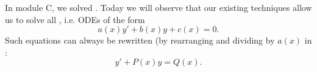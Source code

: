 \begin{applicationActivities}

\begin{observation}
In module C, we solved .
\vfill
Today we will observe that our existing techniques allow us to solve all , i.e. ODEs of the form
\[a(x)y'+b(x)y+c(x)=0.\]
Such equations can always be rewritten (by rearranging and dividing by \(a(x)\) in :
\[y'+P(x)y=Q(x).\]
\end{observation}


\end{applicationActivities}
